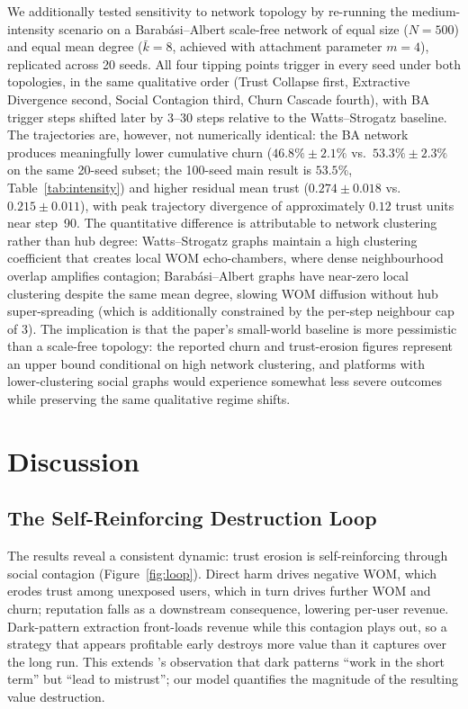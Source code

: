 \documentclass[a4paper,fleqn]{cas-sc}
\begin{document}


We additionally tested sensitivity to network topology by re-running the medium-intensity scenario on a Barab\'asi--Albert scale-free network of equal size ($N=500$) and equal mean degree ($\bar{k}=8$, achieved with attachment parameter $m=4$), replicated across 20 seeds. All four tipping points trigger in every seed under both topologies, in the same qualitative order (Trust Collapse first, Extractive Divergence second, Social Contagion third, Churn Cascade fourth), with BA trigger steps shifted later by 3--30 steps relative to the Watts--Strogatz baseline. The trajectories are, however, not numerically identical: the BA network produces meaningfully lower cumulative churn ($46.8\%\pm2.1\%$ vs.\ $53.3\%\pm2.3\%$ on the same 20-seed subset; the 100-seed main result is $53.5\%$, Table~\ref{tab:intensity}) and higher residual mean trust ($0.274\pm0.018$ vs.\ $0.215\pm0.011$), with peak trajectory divergence of approximately $0.12$ trust units near step~90. The quantitative difference is attributable to network clustering rather than hub degree: Watts--Strogatz graphs maintain a high clustering coefficient that creates local WOM echo-chambers, where dense neighbourhood overlap amplifies contagion; Barab\'asi--Albert graphs have near-zero local clustering despite the same mean degree, slowing WOM diffusion without hub super-spreading (which is additionally constrained by the per-step neighbour cap of 3). The implication is that the paper's small-world baseline is more pessimistic than a scale-free topology: the reported churn and trust-erosion figures represent an upper bound conditional on high network clustering, and platforms with lower-clustering social graphs would experience somewhat less severe outcomes while preserving the same qualitative regime shifts.

\section{Discussion}
\subsection{The Self-Reinforcing Destruction Loop}
The results reveal a consistent dynamic: trust erosion is self-reinforcing through social contagion (Figure~\ref{fig:loop}). Direct harm drives negative WOM, which erodes trust among unexposed users, which in turn drives further WOM and churn; reputation falls as a downstream consequence, lowering per-user revenue. Dark-pattern extraction front-loads revenue while this contagion plays out, so a strategy that appears profitable early destroys more value than it captures over the long run. This extends \citet{cara2019}'s observation that dark patterns ``work in the short term'' but ``lead to mistrust''; our model quantifies the magnitude of the resulting value destruction.
\end{document}

